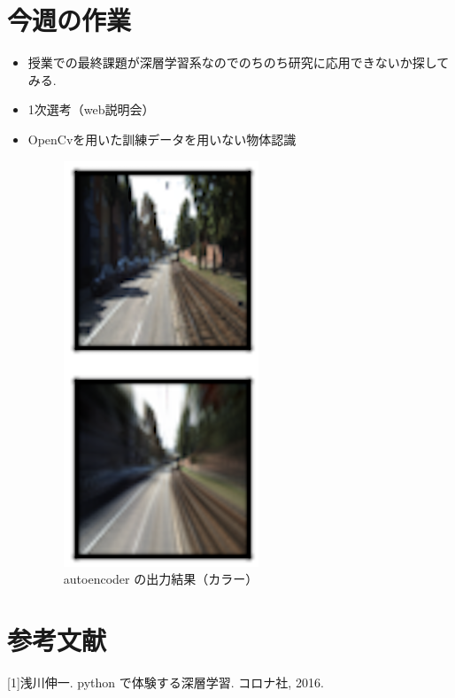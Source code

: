 \section{今週の作業}
\begin{itemize}
        \item 授業での最終課題が深層学習系なのでのちのち研究に応用できないか探してみる.
        \item 1次選考（web説明会）
        \item OpenCvを用いた訓練データを用いない物体認識
\begin{figure}[hb]
\begin{center}
\includegraphics[scale=1.0]{autoencoder_2.png}
\caption{autoencoder の出力結果（カラー）}
\end{center}
\end{figure}
\end{itemize}


\section{参考文献}
[1]浅川伸一. python で体験する深層学習. コロナ社, 2016.




